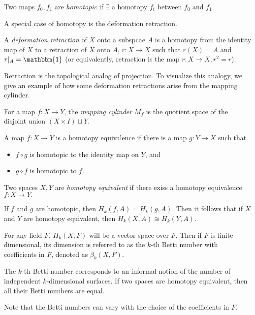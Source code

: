 \documentclass[11pt,reqno,oneside,a4paper]{article}
\begin{document}
\begin{defn}
	Two maps $f_0, f_1$ are \textit{homotopic} if $\exists$ a homotopy $f_t$ between $f_0$ and $f_1$.  
\end{defn}

A special case of homotopy is the deformation retraction. 

\begin{defn}
	A \textit{deformation retraction} of $X$ onto a subspcae $A$ is a homotopy from the identity map of $X$ to a retraction of $X$ onto $A$, $r: X\to X$ such that $r(X) = A$ and $r|_A = \mathbbm{1}$ (or equivalently, retraction is the map $r: X\to X, r^2 =r$). 
\end{defn}

Retraction is the topological analog of projection. To visualize this analogy, we give an example of how some deformation retractions arise from the mapping cylinder.

\begin{defn}
	For a map $f: X\to Y$, the \textit{mapping cylinder} $M_f$ is the quotient space of the disjoint union $(X \times I) \sqcup Y$.
\end{defn}

\begin{defn}
A map $f:X \to Y$ is a homotopy equivalence if there is a map $g: Y \to X$ such that 
\begin{itemize}
	\item $f\circ g$ is homotopic to the identity map on $Y$, and
	\item $g\circ f$ is homotopic to $f$.
\end{itemize}

Two spaces $X,Y$ are\textit{ homotopy equivalent} if there exiss a homotopy equivalence $f: X \to Y. $
\end{defn}

\begin{defn}
	If $f$ and $g$ are homotopic, then $H_k(f,A) = H_k(g,A).$ Then it follows that if $X$ and $Y$ are homotopy equivalent, then $H_k(X,A) \cong H_k(Y,A) $.
\end{defn}

\begin{defn}
	For any field $F$, $H_k(X,F)$ will be a vector space over $F$. Then if $F$ is finite dimensional, its dimension is referred to as the $k$-th Betti number with coefficients in $F$, denoted as $\beta_{k}(X,F).$
	
	The $k$-th Betti number corresponds to an informal notion of the number of independent $k$-dimensional surfaces. If two spaces are homotopy equivalent, then all their Betti numbers are equal. 
	
	Note that the Betti numbers can vary with the choice of the coefficients in $F$. 
\end{defn}
\end{document}
